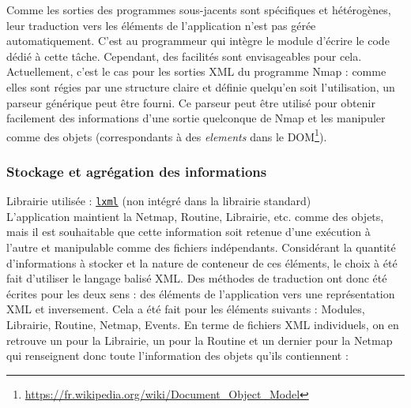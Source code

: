 \documentclass[]{article}
\begin{document}
Comme les sorties des programmes sous-jacents sont spécifiques et hétérogènes, leur traduction vers les éléments de l'application n'est pas gérée automatiquement. C'est au programmeur qui intègre le module d'écrire le code dédié à cette tâche. Cependant, des facilités sont envisageables pour cela. Actuellement, c'est le cas pour les sorties XML du programme Nmap : comme elles sont régies par une structure claire et définie quelqu'en soit l'utilisation, un parseur générique peut être fourni. Ce parseur peut être utilisé pour obtenir facilement des informations d'une sortie quelconque de Nmap et les manipuler comme des objets (correspondants à des \textit{elements} dans le DOM\footnote{\url{https://fr.wikipedia.org/wiki/Document_Object_Model}}).

\newpage

\subsubsection{Stockage et agrégation des informations}
\label{appcfg}
\noindent Librairie utilisée : \href{https://lxml.de}{\texttt{lxml}} (non intégré dans la librairie standard)\\

L'application maintient la Netmap, Routine, Librairie, etc. comme des objets, mais il est souhaitable que cette information soit retenue d'une exécution à l'autre et manipulable comme des fichiers indépendants. Considérant la quantité d'informations à stocker et la nature de conteneur de ces éléments, le choix à été fait d'utiliser le langage balisé XML. Des méthodes de traduction ont donc été écrites pour les deux sens : des éléments de l'application vers une représentation XML et inversement. Cela a été fait pour les éléments suivants : Modules, Librairie, Routine, Netmap, Events. En terme de fichiers XML individuels, on en retrouve un pour la Librairie, un pour la Routine et un dernier pour la Netmap qui renseignent donc toute l'information des objets qu'ils contiennent :\\
\end{document}
